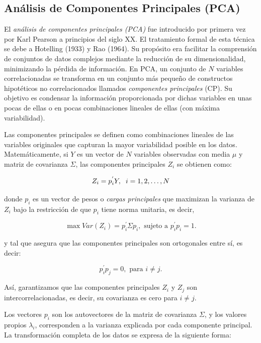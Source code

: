 \subsection{Análisis de Componentes Principales (PCA)}

El \textit{análisis de componentes principales (PCA)} fue introducido por primera vez por Karl Pearson a principios del siglo XX. El 
tratamiento formal de esta técnica se debe a Hotelling (1933) y Rao (1964). Su propósito era facilitar la comprensión de conjuntos 
de datos complejos mediante la reducción de su dimensionalidad, minimizando la pérdida de información. En PCA, un conjunto de $N$ variables correlacionadas
se transforma en un conjunto más pequeño de constructos hipotéticos no correlacionados llamados \textit{componentes principales} (CP).
Su objetivo es condensar la información proporcionada por dichas variables en unas pocas de ellas o en pocas combinaciones lineales de 
ellas (con máxima variabilidad). \newline %


Las componentes principales se definen como combinaciones lineales de las variables originales que capturan la mayor variabilidad
posible en los datos. Matemáticamente, si $Y$ es un vector de $N$ variables observadas con media $\mu$ y matriz de covarianza $\Sigma$,
las componentes principales $Z_{i}$ se obtienen como:


\[
Z_{i} = p^{'}_{i} Y, \hspace{0.2cm} i=1,2,\dots,N
\]

donde $p_{i}$ es un vector de pesos o \textit{cargas principales} que maximizan la varianza de $Z_{i}$ bajo la restricción de que $p_{i}$
tiene norma unitaria, es decir,

\[%
\max Var(Z_{i}) = p_{i}^{'}\Sigma p_{i}, \text{ sujeto a } p_{i}^{'}p_{i} = 1.
\]

y tal que asegura que las componentes principales son ortogonales entre sí, es decir:

\[
p_{i}^{'}p_{j} = 0, \text{ para } i \neq j.
\]

Así, garantizamos que las componentes principales $Z_{i}$ y $Z_{j}$ son intercorrelacionadas, es decir, su covarianza es cero para $i\neq j$.


Los vectores $p_{i}$ son los autovectores de la matriz de covarianza $\Sigma$, y los valores propios $\lambda_{i}$, corresponden
a la varianza explicada por cada componente principal. La transformación completa de los datos se expresa de la siguiente forma:

